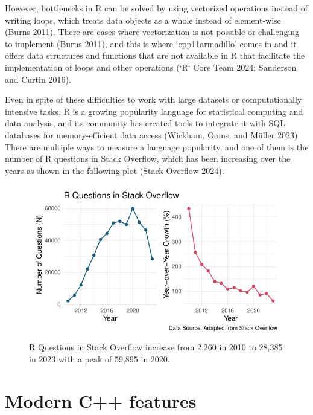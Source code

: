 \documentclass[preprint,12pt]{elsarticle}
\begin{document}
However, bottlenecks in R can be solved by using vectorized operations
instead of writing loops, which treats data objects as a whole instead
of element-wise (Burns 2011). There are cases where vectorization is not
possible or challenging to implement (Burns 2011), and this is where
`cpp11armadillo' comes in and it offers data structures and functions
that are not available in R that facilitate the implementation of loops
and other operations (`R` Core Team 2024; Sanderson and Curtin 2016).

Even in spite of these difficulties to work with large datasets or
computationally intensive tasks, R is a growing popularity language for
statistical computing and data analysis, and its community has created
tools to integrate it with SQL databases for memory-efficient data
access (Wickham, Ooms, and Müller 2023). There are multiple ways to
measure a language popularity, and one of them is the number of R
questions in Stack Overflow, which has been increasing over the years as
shown in the following plot (Stack Overflow 2024).

\begin{figure}[H]

{\centering \includegraphics{cpp11armadillo_files/figure-pdf/stackoverflow-1.pdf}

}

\caption{R Questions in Stack Overflow increase from 2,260 in 2010 to
28,385 in 2023 with a peak of 59,895 in 2020.}

\end{figure}%

\section{Modern C++ features}\label{modern-c-features}
\end{document}
